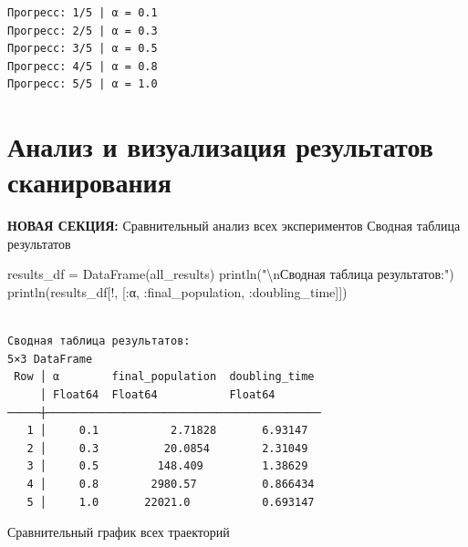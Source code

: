 \documentclass[
  english,
  russian,
  12pt,
  a4paper,
  DIV=11,
  numbers=noendperiod]{scrreprt}
\newenvironment{Shaded}{\begin{snugshade}}{\end{snugshade}}
\newcommand{\FunctionTok}[1]{\textcolor[rgb]{0.28,0.35,0.67}{#1}}
\newcommand{\NormalTok}[1]{\textcolor[rgb]{0.00,0.23,0.31}{#1}}
\newcommand{\OperatorTok}[1]{\textcolor[rgb]{0.37,0.37,0.37}{#1}}
\newcommand{\SpecialCharTok}[1]{\textcolor[rgb]{0.37,0.37,0.37}{#1}}
\newcommand{\StringTok}[1]{\textcolor[rgb]{0.13,0.47,0.30}{#1}}
\begin{document}
\begin{verbatim}
Прогресс: 1/5 | α = 0.1
Прогресс: 2/5 | α = 0.3
Прогресс: 3/5 | α = 0.5
Прогресс: 4/5 | α = 0.8
Прогресс: 5/5 | α = 1.0
\end{verbatim}

\section{Анализ и визуализация результатов
сканирования}\label{ux430ux43dux430ux43bux438ux437-ux438-ux432ux438ux437ux443ux430ux43bux438ux437ux430ux446ux438ux44f-ux440ux435ux437ux443ux43bux44cux442ux430ux442ux43eux432-ux441ux43aux430ux43dux438ux440ux43eux432ux430ux43dux438ux44f}

\textbf{НОВАЯ СЕКЦИЯ:} Сравнительный анализ всех экспериментов Сводная
таблица результатов

\begin{Shaded}
\begin{Highlighting}[]
\NormalTok{results\_df }\OperatorTok{=} \FunctionTok{DataFrame}\NormalTok{(all\_results)}
\FunctionTok{println}\NormalTok{(}\StringTok{"}\SpecialCharTok{\textbackslash{}n}\StringTok{Сводная таблица результатов:"}\NormalTok{)}
\FunctionTok{println}\NormalTok{(results\_df[!, [}\OperatorTok{:}\NormalTok{α, }\OperatorTok{:}\NormalTok{final\_population, }\OperatorTok{:}\NormalTok{doubling\_time]])}
\end{Highlighting}
\end{Shaded}

\begin{verbatim}

Сводная таблица результатов:
5×3 DataFrame
 Row │ α        final_population  doubling_time 
     │ Float64  Float64           Float64       
─────┼──────────────────────────────────────────
   1 │     0.1           2.71828       6.93147
   2 │     0.3          20.0854        2.31049
   3 │     0.5         148.409         1.38629
   4 │     0.8        2980.57          0.866434
   5 │     1.0       22021.0           0.693147
\end{verbatim}

Сравнительный график всех траекторий
\end{document}
